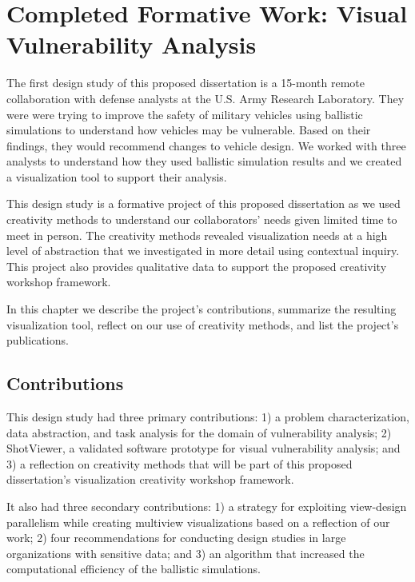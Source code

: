 \chapter{Completed Formative Work: Visual Vulnerability Analysis}
\label{ch:vulnerability}

The first design study of this proposed dissertation is a 15-month remote collaboration with defense analysts at the U.S. Army Research Laboratory. They were were trying to improve the safety of military vehicles using ballistic simulations to understand how vehicles may be vulnerable. Based on their findings, they would recommend changes to vehicle design. We worked with three analysts to understand how they used ballistic simulation results and we created a visualization tool to support their analysis. 


This design study is a formative project of this proposed dissertation as we used creativity methods to understand our collaborators' needs given limited time to meet in person. The creativity methods revealed visualization needs at a high level of abstraction that we investigated in more detail using contextual inquiry. This project also provides qualitative data to support the proposed creativity workshop framework. 

In this chapter we describe the project's contributions, summarize the resulting visualization tool, reflect on our use of creativity methods, and list the project's publications.

\section{Contributions}

This design study had three primary contributions: 1) a problem characterization, data abstraction, and task analysis for the domain of vulnerability analysis; 2) ShotViewer, a validated software prototype for visual vulnerability analysis; and 3) a reflection on creativity methods that will be part of this proposed dissertation's visualization creativity workshop framework.

It also had three secondary contributions: 1) a strategy for exploiting view-design parallelism while creating multiview visualizations based on a reflection of our work; 2) four recommendations for conducting design studies in large organizations with sensitive data; and 3) an algorithm that increased the computational efficiency of the ballistic simulations.

